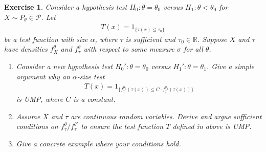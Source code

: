 \documentclass[12pt]{article}
\theoremstyle{colon}
\newtheorem{exercise}{Exercise}
\begin{document}
\begin{exercise}
  Consider a hypothesis test $H_0 : \theta = \theta_0$ versus $H_1 : \theta < \theta_0$ for $X \sim P_\theta \in \mathcal{P}$. Let
  \begin{gather*}
    T(x) = 1_{\{ \tau(x) \leq \tau_0 \}}
  \end{gather*}
  be a test function with size $\alpha$, where $\tau$ is sufficient and $\tau_0 \in \mathbb{R}$. Suppose $X$ and $\tau$ have densities $f_X^\theta$ and $f_\tau^\theta$ with respect to some measure $\sigma$ for all $\theta$.
  \begin{enumerate}[label=\arabic*)]
    \item Consider a new hypothesis test $H_0' : \theta = \theta_0$ versus $H_1' : \theta = \theta_1$. Give a simple argument why an $\alpha$-size test
      \begin{gather*}
        T(x) = 1_{\{ f_\tau^{\theta_0} (\tau(x)) \leq C \cdot f_\tau^{\theta_1} (\tau(x)) \}}
      \end{gather*}
      is UMP, where $C$ is a constant.
    \item Assume $X$ and $\tau$ are continuous random variables. Derive and argue sufficient conditions on $f_\tau^\theta / f_\tau^{\theta'}$ to ensure the test function $T$ defined in above is UMP.
    \item Give a concrete example where your conditions hold.
  \end{enumerate}
\end{exercise}
\end{document}

